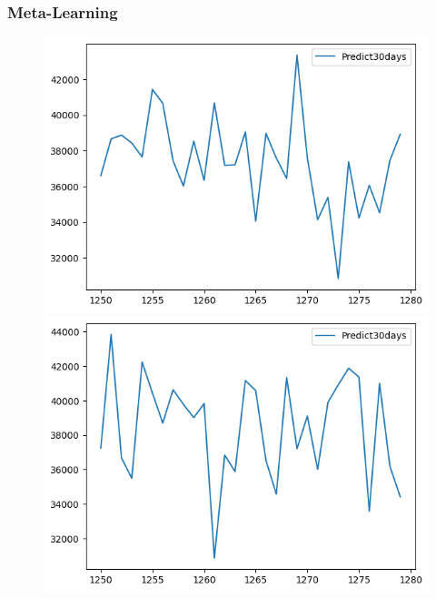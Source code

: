 \subsubsection{Meta-Learning}
\begin{figure}[H]
    \centering
    \begin{minipage}{0.15\textwidth}
    \centering
    \includegraphics[width=1\textwidth]{resources/chapter-5/predicted/BIDV_ML_7_3_next30days.png}
    \end{minipage}
    \hfill
    \begin{minipage}{0.15\textwidth}
    \centering
    \includegraphics[width=1\textwidth]{resources/chapter-5/predicted/BIDV_ML_8_2_next30days.png}
    \end{minipage}
    \hfill
        \begin{minipage}{0.15\textwidth}

\end{minipage}
\end{figure}
